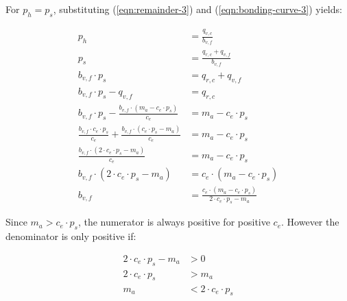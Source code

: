 \documentclass[table, twocolumn]{article}
\begin{document}
For $p_h = p_s$, substituting (\ref{eqn:remainder-3}) and (\ref{eqn:bonding-curve-3})
yields:

\begin{align} \label{eqn:bonding-curve-4}
  p_h                                                                   & =
  \frac{q_{v, c}}{b_{v, f}} \nonumber                                       \\
  p_s                                                                   & =
  \frac{q_{r, c} + q_{v, f}}{b_{v, f}} \nonumber                            \\
  b_{v, f} \cdot p_s                                                    & =
  q_{r, c} + q_{v, f} \nonumber                                             \\
  b_{v, f} \cdot p_s - q_{v, f}                                         & =
  q_{r, c} \nonumber                                                        \\
  b_{v, f} \cdot p_s - \frac{b_{v, f} \cdot (m_a - c_e \cdot p_s)}{c_e} & =
  m_a - c_e \cdot p_s \nonumber                                             \\
  \frac{b_{v, f} \cdot c_e \cdot p_s}{c_e} +
  \frac{b_{v, f} \cdot (c_e \cdot p_s - m_a)}{c_e}                      & =
  m_a - c_e \cdot p_s \nonumber                                             \\
  \frac{b_{v, f} \cdot (2 \cdot c_e \cdot p_s - m_a)}{c_e}              & =
  m_a - c_e \cdot p_s \nonumber                                             \\
  b_{v, f} \cdot (2 \cdot c_e \cdot p_s - m_a)                          & =
  c_e \cdot (m_a - c_e \cdot p_s) \nonumber                                 \\
  b_{v, f}                                                              & =
  \frac{c_e \cdot (m_a - c_e \cdot p_s)}{2 \cdot c_e \cdot p_s - m_a}
\end{align}

Since $m_a > c_e \cdot p_s$, the numerator is always positive for positive $c_e$.
However the denominator is only positive if:

\begin{align} \label{eqn:bonding-curve-5}
  2 \cdot c_e \cdot p_s - m_a & > 0 \nonumber           \\
  2 \cdot c_e \cdot p_s       & > m_a \nonumber         \\
  m_a                         & < 2 \cdot c_e \cdot p_s
\end{align}
\end{document}
